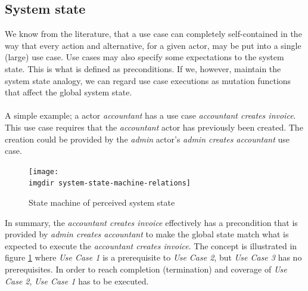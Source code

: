 \subsection{System state}
We know from the literature\cite{larman2005applying}, that a use case can completely self-contained in the way that every action and alternative, for a given actor, may be put into a single (large) use case. Use cases may also specify some expectations to the system state. This is what is defined as preconditions. If we, however, maintain the system state analogy, we can regard use case executions as mutation functions that affect the global system state.\\\\
A simple example; a actor \emph{accountant} has a use case \emph{accountant creates invoice}. This use case requires that the \emph{accountant} actor has previously been created. The creation could be provided by the \emph{admin} actor's \emph{admin creates accountant} use case.
\begin{figure}[h]
\texttt{[image: \\imgdir system-state-machine-relations]}
\centering
\caption{State machine of perceived system state}
\label{fig:system-state-machine-relations}
\end{figure}
In summary, the \emph{accountant creates invoice} effectively has a precondition that is provided by \emph{admin creates accountant} to make the global state match what is expected to execute the \emph{accountant creates invoice}. The concept is illustrated in figure \ref{fig:system-state-machine-relations} where \emph{Use Case 1} is a prerequisite to \emph{Use Case 2}, but \emph{Use Case 3} has no prerequisites. In order to reach completion (termination) and coverage of \emph{Use Case 2}, \emph{Use Case 1} has to be executed.

